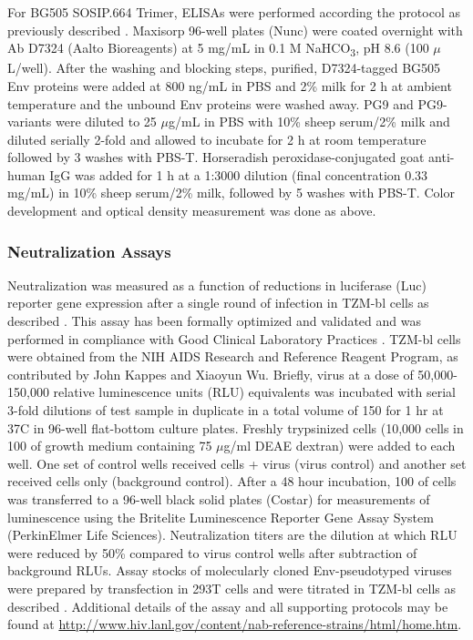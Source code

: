 For BG505 SOSIP.664 Trimer, ELISAs were performed according the protocol as previously described \citep{Sanders:2013gm}. Maxisorp 96-well plates (Nunc) were coated overnight with Ab D7324 (Aalto Bioreagents) at 5 mg/mL in 0.1 M NaHCO\textsubscript{3}, pH 8.6 (100 $\mu$L/well). After the washing and blocking steps, purified, D7324-tagged BG505 Env proteins were added at 800 ng/mL in PBS and 2\% milk for 2 h at ambient temperature and the unbound Env proteins were washed away. PG9 and PG9-variants were diluted to 25 $\mu$g/mL in PBS with 10\% sheep serum/2\% milk and diluted serially 2-fold and allowed to incubate for 2 h at room temperature followed by 3 washes with PBS-T. Horseradish peroxidase-conjugated goat anti-human IgG was added for 1 h at a 1:3000 dilution (final concentration 0.33 mg/mL) in 10\% sheep serum/2\% milk, followed by 5 washes with PBS-T. Color development and optical density measurement was done as above.

\subsubsection{Neutralization Assays}
Neutralization was measured as a function of reductions in luciferase (Luc) reporter gene expression after a single round of infection in TZM-bl cells as described \citep{Montefiori:2009hj,Simek:2009cn}. This assay has been formally optimized and validated and was performed in compliance with Good Clinical Laboratory Practices \citep{SarzottiKelsoe:2013hr}. TZM-bl cells were obtained from the NIH AIDS Research and Reference Reagent Program, as contributed by John Kappes and Xiaoyun Wu.  Briefly, virus at a dose of 50,000-150,000 relative luminescence units (RLU) equivalents was incubated with serial 3-fold dilutions of test sample in duplicate in a total volume of 150 \microliter for 1 hr at 37\degree C in 96-well flat-bottom culture plates.  Freshly trypsinized cells (10,000 cells in 100 \microliter of growth medium containing 75 $\mu$g/ml DEAE dextran) were added to each well.  One set of control wells received cells + virus (virus control) and another set received cells only (background control). After a 48 hour incubation, 100 \microliter of cells was transferred to a 96-well black solid plates (Costar) for measurements of luminescence using the Britelite Luminescence Reporter Gene Assay System (PerkinElmer Life Sciences). Neutralization titers are the dilution at which RLU were reduced by 50\% compared to virus control wells after subtraction of background RLUs.  Assay stocks of molecularly cloned Env-pseudotyped viruses were prepared by transfection in 293T cells and were titrated in TZM-bl cells as described \citep{Li:2005go}. Additional details of the assay and all supporting protocols may be found at \url{http://www.hiv.lanl.gov/content/nab-reference-strains/html/home.htm}.


